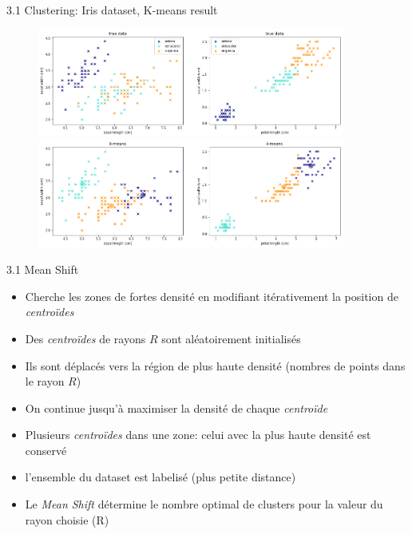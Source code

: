 \begin{frame}{3.1 Clustering: Iris dataset, K-means result}
  \begin{figure}
    \includegraphics[width=0.9\textwidth]{fig/clusteringTrue.png}
    \includegraphics[width=0.9\textwidth]{fig/clusteringKmeans.png}
  \end{figure}
\end{frame}

\begin{frame}{3.1 Mean Shift}
  \begin{itemize}
  \item Cherche les zones de fortes densité en modifiant itérativement la position de \textit{centroïdes}
  \item Des \textit{centroïdes} de rayons $R$ sont aléatoirement initialisés
  \item Ils sont déplacés vers la région de plus haute densité (nombres de points dans le rayon $R$)
  \item On continue jusqu'à maximiser la densité de chaque \textit{centroïde}
  \item Plusieurs \textit{centroïdes} dans une zone: celui avec la plus haute densité est conservé
  \item l'ensemble du dataset est labelisé (plus petite distance)
  \item Le \textit{Mean Shift} détermine le nombre optimal de clusters pour la valeur du rayon choisie (R)
  \end{itemize}
\end{frame}

